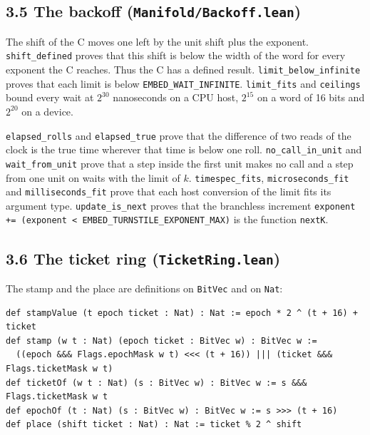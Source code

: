 \subsection{\texorpdfstring{3.5 The backoff (\texttt{Manifold/\allowbreak{}Backoff.\allowbreak{}lean})}{3.5 The backoff (Manifold/Backoff.lean)}}

The shift of the C moves one left by the unit shift plus the exponent. \texttt{shift\_\allowbreak{}defined} proves that this shift is below the width of the word for every exponent the C reaches. Thus the C has a defined result. \texttt{limit\_\allowbreak{}below\_\allowbreak{}infinite} proves that each limit is below \texttt{EMBED\_\allowbreak{}WAIT\_\allowbreak{}INFINITE}. \texttt{limit\_\allowbreak{}fits} and \texttt{ceilings} bound every wait at \(2^{30}\) nanoseconds on a CPU host, \(2^{15}\) on a word of 16 bits and \(2^{20}\) on a device.

\texttt{elapsed\_\allowbreak{}rolls} and \texttt{elapsed\_\allowbreak{}true} prove that the difference of two reads of the clock is the true time wherever that time is below one roll. \texttt{no\_\allowbreak{}call\_\allowbreak{}in\_\allowbreak{}unit} and \texttt{wait\_\allowbreak{}from\_\allowbreak{}unit} prove that a step inside the first unit makes no call and a step from one unit on waits with the limit of \(k\). \texttt{timespec\_\allowbreak{}fits}, \texttt{microseconds\_\allowbreak{}fit} and \texttt{milliseconds\_\allowbreak{}fit} prove that each host conversion of the limit fits its argument type. \texttt{update\_\allowbreak{}is\_\allowbreak{}next} proves that the branchless increment \texttt{exponent += (exponent < EMBED\_\allowbreak{}TURNSTILE\_\allowbreak{}EXPONENT\_\allowbreak{}MAX)} is the function \texttt{next\allowbreak{}K}.

\subsection{\texorpdfstring{3.6 The ticket ring (\texttt{Ticket\allowbreak{}Ring.\allowbreak{}lean})}{3.6 The ticket ring (TicketRing.lean)}}

The stamp and the place are definitions on \texttt{Bit\allowbreak{}Vec} and on \texttt{Nat}:

\begin{Verbatim}
def stampValue (t epoch ticket : Nat) : Nat := epoch * 2 ^ (t + 16) + ticket
def stamp (w t : Nat) (epoch ticket : BitVec w) : BitVec w :=
  ((epoch &&& Flags.epochMask w t) <<< (t + 16)) ||| (ticket &&& Flags.ticketMask w t)
def ticketOf (w t : Nat) (s : BitVec w) : BitVec w := s &&& Flags.ticketMask w t
def epochOf (t : Nat) (s : BitVec w) : BitVec w := s >>> (t + 16)
def place (shift ticket : Nat) : Nat := ticket % 2 ^ shift
\end{Verbatim}

